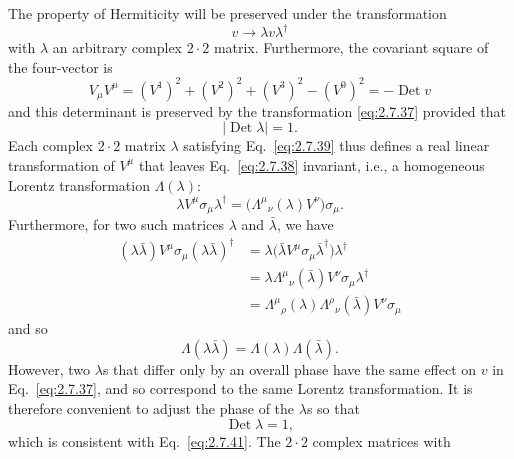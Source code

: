 The property of Hermiticity will be preserved under the transformation
\begin{equation}
  v\longrightarrow\lambda v\lambda^\dagger
  \tag{2.7.37}\label{eq:2.7.37}
\end{equation}
with $\lambda$ an arbitrary complex $2\cdot2$ matrix. Furthermore, the
covariant square of the four-vector is
\begin{equation}
  V_\mu V^\mu=(V^1)^2+(V^2)^2+(V^3)^2-(V^0)^2
    =-\operatorname{Det}v
  \tag{2.7.38}\label{eq:2.7.38}
\end{equation}
and this determinant is preserved by the transformation \eqref{eq:2.7.37} provided that
\begin{equation}
  |\operatorname{Det}\lambda|=1.
  \tag{2.7.39}\label{eq:2.7.39}
\end{equation}
Each complex $2\cdot2$ matrix $\lambda$ satisfying Eq.~\eqref{eq:2.7.39} thus defines a
real linear transformation of $V^\mu$ that leaves Eq.~\eqref{eq:2.7.38} invariant, i.e.,
a homogeneous Lorentz transformation $\Lambda(\lambda)$:
\begin{equation}
  \lambda V^\mu\sigma_\mu\lambda^\dagger
    =\bigl(\Lambda^\mu{}_{\nu}(\lambda)V^\nu\bigr)\sigma_\mu.
  \tag{2.7.40}\label{eq:2.7.40}
\end{equation}
Furthermore, for two such matrices $\lambda$ and $\bar\lambda$, we have
\begin{align*}
  (\lambda\bar\lambda)V^\mu\sigma_\mu
    (\lambda\bar\lambda)^\dagger
  &=\lambda\bigl(\bar\lambda V^\mu\sigma_\mu
      \bar\lambda^\dagger\bigr)\lambda^\dagger\\
  &=\lambda\Lambda^\mu{}_{\nu}(\bar\lambda)V^\nu
      \sigma_\mu\lambda^\dagger\\
  &=\Lambda^\mu{}_{\rho}(\lambda)
      \Lambda^\rho{}_{\nu}(\bar\lambda)V^\nu\sigma_\mu
\end{align*}
and so
\begin{equation}
  \Lambda(\lambda\bar\lambda)=\Lambda(\lambda)\Lambda(\bar\lambda).
  \tag{2.7.41}\label{eq:2.7.41}
\end{equation}
However, two $\lambda$s that differ only by an overall phase have the same
effect on $v$ in Eq.~\eqref{eq:2.7.37}, and so correspond to the same Lorentz
transformation. It is therefore convenient to adjust the phase of the
$\lambda$s so that
\begin{equation}
  \operatorname{Det}\lambda=1,
  \tag{2.7.42}\label{eq:2.7.42}
\end{equation}
which is consistent with Eq.~\eqref{eq:2.7.41}. The $2\cdot2$ complex matrices with
